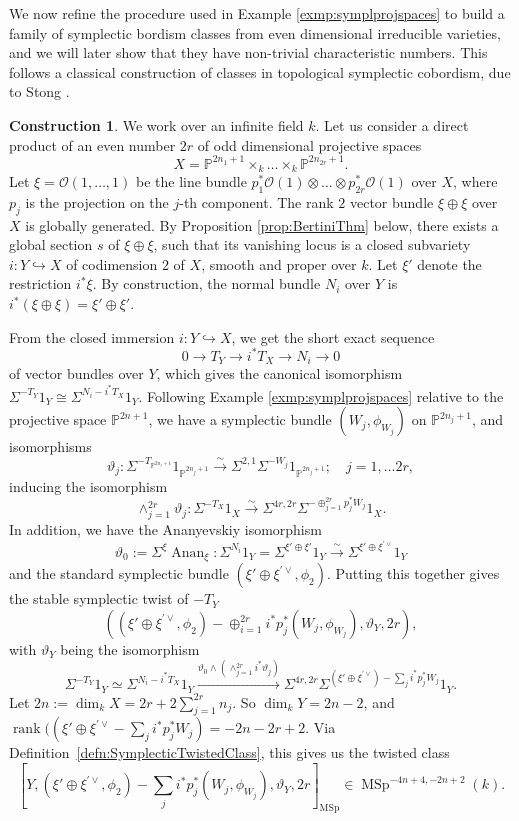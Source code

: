 \documentclass[10pt]{amsart}
\theoremstyle{definition}
\newtheorem{constr}[defn]{Construction}
\theoremstyle{plain}
\numberwithin{equation}{section}
\newcommand{\0}{\emptyset}
\renewcommand{\P}{{\mathbb P}}
\newcommand{\MSp}{{\operatorname{MSp}}}
\renewcommand{\dim}{{\operatorname{dim}}}
\newcommand{\rnk}{{\operatorname{rank}}}
\newcommand{\Anan}{{\operatorname{Anan}}}
\begin{document}
We now refine the procedure used in Example \ref{exmp:symplprojspaces} to build a family of symplectic bordism classes from even dimensional irreducible varieties, and we will later show that they have non-trivial characteristic numbers. This follows a classical construction of classes in topological symplectic cobordism, due to Stong \cite[Section 4]{Stong-cobordism}.

\begin{constr}
\label{constr:Stongvars} We work over an infinite field $k$.
Let us consider a direct product of an even number $2r$ of odd dimensional projective spaces $$X=\mathbb{P}^{2n_1 +1} \times_k \ldots \times_k \mathbb{P}^{2n_{2r} +1}.$$
Let $\xi=\mathcal{O}(1,\ldots,1)$ be the line bundle $p_1^*\mathcal{O}(1)\otimes \ldots \otimes p_{2r}^* \mathcal{O}(1)$ over $X$, where $p_j$ is the projection on the $j$-th component. The rank $2$ vector bundle $\xi \oplus \xi$ over $X$ is globally generated. By Proposition \ref{prop:BertiniThm} below, there exists a global section $s$ of $\xi \oplus \xi$, such that its vanishing locus is a closed subvariety $i:Y\hookrightarrow X$ of codimension $2$ of $X$, smooth and proper over $k$. Let $\xi'$ denote the restriction $i^*\xi$. By construction, the normal bundle $N_i$ over $Y$ is $i^*(\xi \oplus \xi)=\xi'\oplus \xi'$. 

From the closed immersion $i:Y \hookrightarrow X$, we get the short exact sequence
\[
0\to T_Y\to i^*T_X\to N_i\to 0
\]
of vector bundles over $Y$, which gives the canonical isomorphism $\Sigma^{-T_Y}1_Y\cong \Sigma^{N_i-i^*T_X}1_Y$. Following Example \ref{exmp:symplprojspaces} relative to the projective space $\P^{2n+1}$, we have a symplectic bundle $(W_j,\phi_{W_j})$ on $\P^{2n_j+1}$, and isomorphisms
\[
\vartheta_j:\Sigma^{-T_{\P^{2n_j+1}}}1_{\P^{2n_j+1}}\xrightarrow{\sim}\Sigma^{2,1}\Sigma^{-W_j}1_{\P^{2n_j+1}};\quad j=1,\ldots 2r,
\]
inducing the isomorphism
\[
\wedge_{j=1}^{2r}\vartheta_j:\Sigma^{-T_X}1_X\xrightarrow{\sim} \Sigma^{4r,2r}\Sigma^{-\oplus_{j=1}^{2r}p_j^*W_j}1_X.
\]
In addition, we have the Ananyevskiy isomorphism
\[
\vartheta_0:=\Sigma^{\xi}\Anan_\xi:\Sigma^{N_i}1_Y=\Sigma^{\xi'\oplus \xi'}1_Y\xrightarrow{\sim} \Sigma^{\xi'\oplus \xi^{\prime\vee}}1_Y
\]
and the standard symplectic bundle $(\xi'\oplus \xi^{\prime\vee},\phi_2)$. Putting this together gives the stable symplectic twist of $-T_Y$
\[
((\xi'\oplus \xi^{\prime\vee},\phi_2)-\oplus_{i=1}^{2r}i^*p_j^*(W_j, \phi_{W_j}), \vartheta_Y, 2r),
\]
with $\vartheta_Y$ being the isomorphism
\[
\Sigma^{-T_Y}1_Y\simeq \Sigma^{N_i-i^*T_X}1_Y\xrightarrow{\vartheta_0\wedge
(\wedge_{j=1}^{2r}i^*\vartheta_j)}\Sigma^{4r,2r}\Sigma^{(\xi'\oplus \xi^{\prime\vee})-\sum_ji^*p_j^*W_j}1_Y.
\]
Let $2n:=\dim_kX=2r+2\sum_{j=1}^{2r}n_j$. So $\dim_kY=2n-2$, and $\rnk((\xi'\oplus \xi^{\prime\vee}-\sum_ji^*p_j^*W_j)=-2n-2r+2$. Via Definition~\ref{defn:SymplecticTwistedClass}, this gives us the twisted class
\[
[Y, (\xi'\oplus \xi^{\prime\vee},\phi_2)-\sum_ji^*p_j^*(W_j,\phi_{W_j}), \vartheta_Y, 2r]_\MSp\in
\MSp^{-4n+4,-2n+2}(k).
\]
\end{constr}
\end{document}
